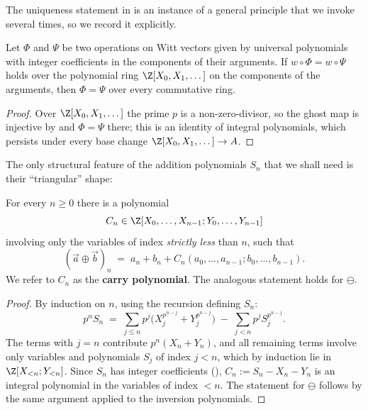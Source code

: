 The uniqueness statement in  is an instance of a
general principle that we invoke several times, so we record it explicitly.

\begin{lemma}\label{lemma:ghost_principle}
Let $\Phi$ and $\Psi$ be two operations on Witt vectors given by universal polynomials
with integer coefficients in the components of their arguments. If
$w \circ \Phi = w \circ \Psi$ holds over the polynomial ring
$\Z[X_0, X_1, \dots]$ on the components of the arguments, then $\Phi = \Psi$ over
every commutative ring.
\end{lemma}

\begin{proof}
Over $\Z[X_0, X_1, \dots]$ the prime $p$ is a non-zero-divisor, so the ghost map is
injective by  and $\Phi = \Psi$ there; this is an
identity of integral polynomials, which persists under every base change
$\Z[X_0, X_1, \dots] \to A$.
\end{proof}

The only structural feature of the addition polynomials $S_n$ that we shall need is
their ``triangular'' shape:

\begin{prop}\label{prop:witt_addition_shape}
For every $n \geq 0$ there is a polynomial
\[
C_n \in \Z[X_0, \dots, X_{n-1}; Y_0, \dots, Y_{n-1}]
\]
involving only the variables of index \emph{strictly less} than $n$, such that
\begin{equation}\label{eq:witt_addition_shape}
(\vec a \oplus \vec b)_n \;=\; a_n + b_n + C_n(a_0, \dots, a_{n-1}; b_0, \dots, b_{n-1}).
\end{equation}
We refer to $C_n$ as the \textbf{carry polynomial}. The analogous statement holds for
$\ominus$.
\end{prop}

\begin{proof}
By induction on $n$, using the recursion defining $S_n$:
\[
p^n S_n \;=\; \sum_{j \leq n} p^j \bigl(X_j^{p^{n-j}} + Y_j^{p^{n-j}}\bigr)
\;-\; \sum_{j < n} p^j S_j^{p^{n-j}} .
\]
The terms with $j = n$ contribute $p^n (X_n + Y_n)$, and all remaining terms involve
only variables and polynomials $S_j$ of index $j < n$, which by induction lie in
$\Z[X_{<n}; Y_{<n}]$. Since $S_n$ has integer coefficients
(), $C_n := S_n - X_n - Y_n$ is an integral
polynomial in the variables of index $< n$. The statement for $\ominus$ follows by the
same argument applied to the inversion polynomials.
\end{proof}

